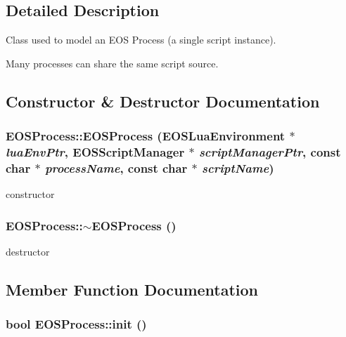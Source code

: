\subsection{Detailed Description}
Class used to model an EOS Process (a single script instance). 

Many processes can share the same script source. 

\subsection{Constructor \& Destructor Documentation}
\hypertarget{classEOSProcess_7c1ceeba22b5a334c0f95e32facddbea}{
\subsubsection[{EOSProcess}]{\setlength{\rightskip}{0pt plus 5cm}EOSProcess::EOSProcess ({\bf EOSLuaEnvironment} $\ast$ {\em luaEnvPtr}, \/  {\bf EOSScriptManager} $\ast$ {\em scriptManagerPtr}, \/  const char $\ast$ {\em processName}, \/  const char $\ast$ {\em scriptName})}}
\label{classEOSProcess_7c1ceeba22b5a334c0f95e32facddbea}


constructor 

\hypertarget{classEOSProcess_4204e2edd0f82d46409d37cbf309c8c6}{
\subsubsection[{$\sim$EOSProcess}]{\setlength{\rightskip}{0pt plus 5cm}EOSProcess::$\sim$EOSProcess ()}}
\label{classEOSProcess_4204e2edd0f82d46409d37cbf309c8c6}


destructor 



\subsection{Member Function Documentation}
\hypertarget{classEOSProcess_e595b8a353aac17d1ded7811d137a0ca}{
\subsubsection[{init}]{\setlength{\rightskip}{0pt plus 5cm}bool EOSProcess::init ()}}
\label{classEOSProcess_e595b8a353aac17d1ded7811d137a0ca}


